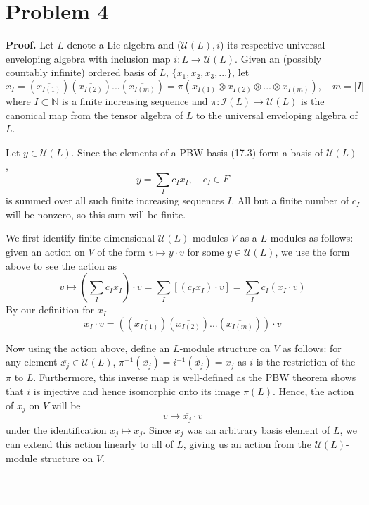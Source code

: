 \documentclass[12pt]{article}%
\newenvironment{proof}[1][Proof]{\textbf{#1.} }{\ \rule{0.5em}{0.5em}}
\begin{document}
\section*{Problem 4}
\begin{proof}
  Let $L$ denote a Lie algebra and ($\mathcal{U}(L),i$) its respective universal enveloping algebra with inclusion map $i: L \rightarrow \mathcal{U}(L)$. Given an (possibly countably infinite) ordered basis of $L$, $\{x_1,x_2,x_3,...\}$, let $$x_I = (\overline{x_{I(1)}})(\overline{x_{I(2)}})...(\overline{x_{I(m)}})= \pi(x_{I(1)} \otimes x_{I(2)} \otimes ... \otimes x_{I(m)}), \quad m = |I|$$ where $I \subset \mathbb{N}$ is a finite increasing sequence and $\pi:\mathcal{I}(L) \rightarrow \mathcal{U}(L)$ is the canonical map from the tensor algebra of $L$ to the universal enveloping algebra of $L$. \newline

  Let $y \in \mathcal{U}(L)$. Since the elements of a PBW basis (17.3) form a basis of $\mathcal{U}(L)$, $$y = \sum_I c_I x_I, \quad c_I \in F$$ is summed over all such finite increasing sequences $I$. All but a finite number of $c_I$ will be nonzero, so this sum will be finite. \newline

  We first identify finite-dimensional $\mathcal{U}(L)$-modules $V$ as a $L$-modules as follows: given an action on $V$ of the form
  $ v \mapsto y \cdot v $ for some $y \in \mathcal{U}(L)$, we use the form above to see the action as
  $$ v \mapsto (\sum_I c_I x_I)\cdot v = \sum_I [(c_Ix_I)\cdot v] = \sum_I c_I(x_I \cdot v)$$
  By our definition for $x_I$
  $$ x_I \cdot v = ((\overline{x_{I(1)}})(\overline{x_{I(2)}})...(\overline{x_{I(m)}}))\cdot v $$

  Now using the action above, define an $L$-module structure on $V$ as follows:
  for any element $\overline{x_{j}} \in \mathcal{U}(L)$, $\pi^{-1}(\overline{x_{j}}) = i^{-1}(\overline{x_{j}}) = x_j$ as $i$ is the restriction of the $\pi$ to $L$. Furthermore, this inverse map is well-defined as the PBW theorem shows that $i$ is injective and hence isomorphic onto its image $\pi(L)$.
  Hence, the action of $x_j$ on $V$ will be
 $$ v \mapsto \overline{x_{j}} \cdot v $$ under the identification $x_j \mapsto \overline{x_{j}}$. Since $x_j$ was an arbitrary basis element of $L$, we can extend this action linearly to all of $L$, giving us an action from the $\mathcal{U}(L)$-module structure on $V$. \newline


\end{proof}
\end{document}
